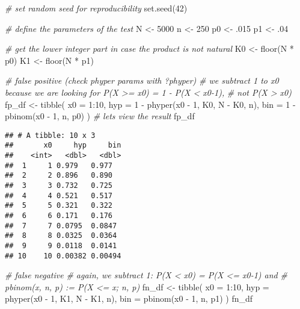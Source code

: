 \documentclass[
  oneside]{book}
\newenvironment{Shaded}{\begin{snugshade}}{\end{snugshade}}
\newcommand{\AttributeTok}[1]{\textcolor[rgb]{0.77,0.63,0.00}{#1}}
\newcommand{\CommentTok}[1]{\textcolor[rgb]{0.56,0.35,0.01}{\textit{#1}}}
\newcommand{\DecValTok}[1]{\textcolor[rgb]{0.00,0.00,0.81}{#1}}
\newcommand{\FunctionTok}[1]{\textcolor[rgb]{0.00,0.00,0.00}{#1}}
\newcommand{\NormalTok}[1]{#1}
\newcommand{\OtherTok}[1]{\textcolor[rgb]{0.56,0.35,0.01}{#1}}
\newcommand{\SpecialCharTok}[1]{\textcolor[rgb]{0.00,0.00,0.00}{#1}}
\begin{document}
\begin{Shaded}
\begin{Highlighting}[]
\CommentTok{\# set random seed for reproducibility}
\FunctionTok{set.seed}\NormalTok{(}\DecValTok{42}\NormalTok{)}

\CommentTok{\# define the parameters of the test}
\NormalTok{N }\OtherTok{\textless{}{-}} \DecValTok{5000}
\NormalTok{n }\OtherTok{\textless{}{-}} \DecValTok{250}
\NormalTok{p0 }\OtherTok{\textless{}{-}}\NormalTok{ .}\DecValTok{015}
\NormalTok{p1 }\OtherTok{\textless{}{-}}\NormalTok{ .}\DecValTok{04}

\CommentTok{\# get the lower integer part in case the product is not natural}
\NormalTok{K0 }\OtherTok{\textless{}{-}} \FunctionTok{floor}\NormalTok{(N }\SpecialCharTok{*}\NormalTok{ p0)}
\NormalTok{K1 }\OtherTok{\textless{}{-}} \FunctionTok{floor}\NormalTok{(N }\SpecialCharTok{*}\NormalTok{ p1)}

\CommentTok{\# false positive (check phyper params with ?phyper)}
\CommentTok{\# we subtract 1 to x0 because we are looking for P(X \textgreater{}= x0) = 1 {-} P(X \textless{} x0{-}1),}
\CommentTok{\# not P(X \textgreater{} x0)}
\NormalTok{fp\_df }\OtherTok{\textless{}{-}} \FunctionTok{tibble}\NormalTok{(}
  \AttributeTok{x0 =} \DecValTok{1}\SpecialCharTok{:}\DecValTok{10}\NormalTok{,}
  \AttributeTok{hyp =} \DecValTok{1} \SpecialCharTok{{-}} \FunctionTok{phyper}\NormalTok{(x0 }\SpecialCharTok{{-}} \DecValTok{1}\NormalTok{, K0, N }\SpecialCharTok{{-}}\NormalTok{ K0, n),}
  \AttributeTok{bin =} \DecValTok{1} \SpecialCharTok{{-}} \FunctionTok{pbinom}\NormalTok{(x0 }\SpecialCharTok{{-}} \DecValTok{1}\NormalTok{, n, p0)}
\NormalTok{)}
\CommentTok{\# let\textquotesingle{}s view the result}
\NormalTok{fp\_df}
\end{Highlighting}
\end{Shaded}

\begin{verbatim}
## # A tibble: 10 x 3
##       x0     hyp     bin
##    <int>   <dbl>   <dbl>
##  1     1 0.979   0.977  
##  2     2 0.896   0.890  
##  3     3 0.732   0.725  
##  4     4 0.521   0.517  
##  5     5 0.321   0.322  
##  6     6 0.171   0.176  
##  7     7 0.0795  0.0847 
##  8     8 0.0325  0.0364 
##  9     9 0.0118  0.0141 
## 10    10 0.00382 0.00494
\end{verbatim}

\begin{Shaded}
\begin{Highlighting}[]
\CommentTok{\# false negative}
\CommentTok{\# again, we subtract 1: P(X \textless{} x0) = P(X \textless{}= x0{-}1) and}
\CommentTok{\# pbinom(x, n, p) := P(X \textless{}= x; n, p)}
\NormalTok{fn\_df }\OtherTok{\textless{}{-}} \FunctionTok{tibble}\NormalTok{(}
  \AttributeTok{x0 =} \DecValTok{1}\SpecialCharTok{:}\DecValTok{10}\NormalTok{,}
  \AttributeTok{hyp =} \FunctionTok{phyper}\NormalTok{(x0 }\SpecialCharTok{{-}} \DecValTok{1}\NormalTok{, K1, N }\SpecialCharTok{{-}}\NormalTok{ K1, n),}
  \AttributeTok{bin =} \FunctionTok{pbinom}\NormalTok{(x0 }\SpecialCharTok{{-}} \DecValTok{1}\NormalTok{, n, p1)}
\NormalTok{)}
\NormalTok{fn\_df}
\end{Highlighting}
\end{Shaded}
\end{document}
